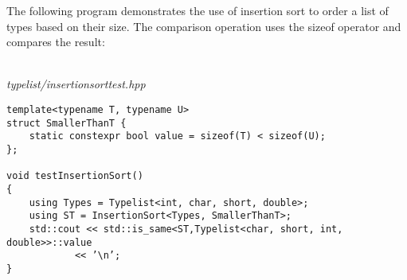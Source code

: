 The following program demonstrates the use of insertion sort to order a list of types based on their size. The comparison operation uses the sizeof operator and compares the result:

\hspace*{\fill} \\ %
\noindent
\textit{typelist/insertionsorttest.hpp}
\begin{lstlisting}[style=styleCXX]
template<typename T, typename U>
struct SmallerThanT {
	static constexpr bool value = sizeof(T) < sizeof(U);
};

void testInsertionSort()
{
	using Types = Typelist<int, char, short, double>;
	using ST = InsertionSort<Types, SmallerThanT>;
	std::cout << std::is_same<ST,Typelist<char, short, int, double>>::value
			<< ’\n’;
}
\end{lstlisting}

























